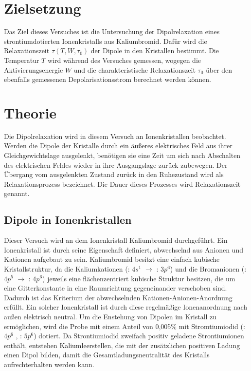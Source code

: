 \section{Zielsetzung}
\label{sec:Zielsetzung}

Das Ziel dieses Versuches ist die Untersuchung der Dipolrelaxation eines
strontiumdotierten Ionenkristalls aus Kaliumbromid.
Dafür wird die Relaxationszeit $\tau(T,W,\tau_{\text{0}})$ der Dipole in den 
Kristallen bestimmt. Die Temperatur $T$ wird während des Versuches gemessen,
wogegen die Aktivierungsenergie $W$ und die charakteristische Relaxationszeit $\tau_{0}$
über den ebenfalls gemessenen Depolarisationsstrom berechnet werden können.

\section{Theorie}
\label{sec:Theorie}

Die Dipolrelaxation wird in diesem Versuch an Ionenkristallen beobachtet.
Werden die Dipole der Kristalle durch ein äußeres elektrisches Feld aus ihrer 
Gleichgewichtslage ausgelenkt, benötigen sie eine Zeit um sich nach Abschalten des 
elektrischen Feldes wieder in ihre Ausgangslage zurück zubewegen. Der Übergang 
vom ausgelenkten Zustand zurück in den Ruhezustand wird als Relaxationsprozess 
bezeichnet. Die Dauer dieses Prozesses wird Relaxationszeit genannt.

\subsection{Dipole in Ionenkristallen}
\label{sec:Ionenkristalle}

Dieser Versuch wird an dem  Ionenkristall Kaliumbromid durchgeführt.
Ein Ionenkristall ist durch seine Eigenschaft definiert, abwechselnd aus Anionen
und Kationen aufgebaut zu sein.
Kaliumbromid besitzt eine einfach kubische Kristallstruktur,
da die Kaliumkationen (: $4s^1$ $\to$ : $3p^6$) und die Bromanionen 
(: $4p^5$ $\to$ : $4p^6$)
jeweils eine flächenzentriert kubische Struktur besitzen, die 
um eine Gitterkonstante in eine Raumrichtung gegeneinander verschoben sind.
Dadurch ist das Kriterium der abwechselnden Kationen-Anionen-Anordnung 
erfüllt. Ein solcher Ionenkristall ist durch diese regelmäßige Ionenanordnung nach außen
elektrisch neutral. Um die Enstehung von Dipolen im Kristall zu ermöglichen, wird 
die Probe mit einem Anteil von 0,005\% mit 
Stromtiumiodid (: $4p^6$ , : $5p^6$) dotiert. Da Strontiumiodid zweifach positiv 
geladene Strontiumionen enthält, entstehen Kaliumleerstellen, die mit der 
zusätzlichen positiven Ladung einen Dipol bilden, damit die Gesamtladungsneutralität des
Kristalls aufrechterhalten werden kann. 


